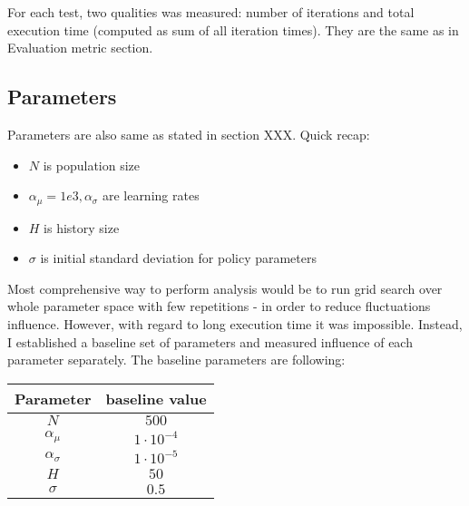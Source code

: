 \documentclass[12pt]{article}
\begin{document}
For each test, two qualities was measured: number of iterations and total execution time (computed as sum of all iteration times). They are the same as in Evaluation metric section.

\subsection{Parameters}

Parameters are also same as stated in section XXX. Quick recap:

\begin{itemize}
\item $N$ is population size
\item $\alpha_\mu = 1e3, \alpha_\sigma$ are learning rates
\item $H$ is history size
\item $\sigma$ is initial standard deviation for policy parameters

\end{itemize}

Most comprehensive way to perform analysis would be to run grid search over whole parameter space with few repetitions - in order to reduce fluctuations influence. However, with regard to long execution time it was impossible. Instead, I established a baseline set of parameters and measured influence of each parameter separately. The baseline parameters are following:

\begin{tabular}{|c|c|}
\hline 
Parameter & baseline value \\
\hline 
$N$ & $500$ \\
\hline 
$\alpha_\mu$ & $1 \cdot 10^{-4}$ \\
\hline 
$\alpha_\sigma$ & $1 \cdot 10^{-5}$ \\
\hline 
$H$ & $50$ \\
\hline 
$\sigma$ & $0.5$ \\
\hline 
\end{tabular} 


\newpage


 
\end{document}
